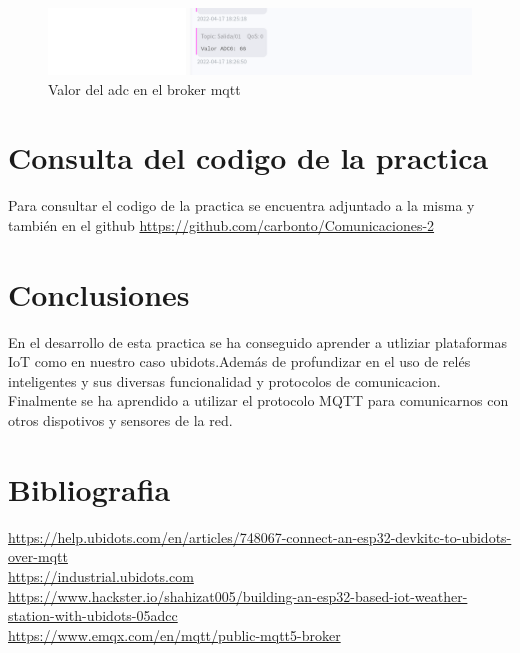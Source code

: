 \documentclass[11pt, letterpaper]{article}
\begin{document}
\begin{figure}[h]
    \centering
    \includegraphics[width=\textwidth]{Resultado_broker.png}
    \caption{Valor del adc en el broker mqtt}
    \label{fig:resultado_web}
\end{figure}

\section{Consulta del codigo de la practica}
Para consultar el codigo de la practica se encuentra adjuntado a la misma y también en el github \url{https://github.com/carbonto/Comunicaciones-2}


\section{Conclusiones}
En el desarrollo de esta practica se ha conseguido aprender a utliziar plataformas IoT como en nuestro caso
ubidots.Además de profundizar en el uso de relés inteligentes y sus diversas funcionalidad y protocolos de comunicacion. Finalmente se ha aprendido
a utilizar el protocolo MQTT para comunicarnos con otros dispotivos y sensores de la red.


\pagebreak
\section{Bibliografia}

\url{https://help.ubidots.com/en/articles/748067-connect-an-esp32-devkitc-to-ubidots-over-mqtt}\\
\url{https://industrial.ubidots.com}\\
\url{https://www.hackster.io/shahizat005/building-an-esp32-based-iot-weather-station-with-ubidots-05adcc}\\
\url{https://www.emqx.com/en/mqtt/public-mqtt5-broker}\\
\end{document}
